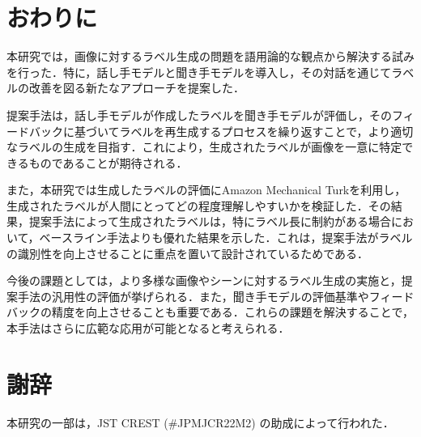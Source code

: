 \documentclass[a4paper,11pt]{jreport}
\begin{document}
\chapter{おわりに}

本研究では，画像に対するラベル生成の問題を語用論的な観点から解決する試みを行った．特に，話し手モデルと聞き手モデルを導入し，その対話を通じてラベルの改善を図る新たなアプローチを提案した．

提案手法は，話し手モデルが作成したラベルを聞き手モデルが評価し，そのフィードバックに基づいてラベルを再生成するプロセスを繰り返すことで，より適切なラベルの生成を目指す．これにより，生成されたラベルが画像を一意に特定できるものであることが期待される．

また，本研究では生成したラベルの評価にAmazon Mechanical Turkを利用し，生成されたラベルが人間にとってどの程度理解しやすいかを検証した．その結果，提案手法によって生成されたラベルは，特にラベル長に制約がある場合において，ベースライン手法よりも優れた結果を示した．これは，提案手法がラベルの識別性を向上させることに重点を置いて設計されているためである．

今後の課題としては，より多様な画像やシーンに対するラベル生成の実施と，提案手法の汎用性の評価が挙げられる．また，聞き手モデルの評価基準やフィードバックの精度を向上させることも重要である．これらの課題を解決することで，本手法はさらに広範な応用が可能となると考えられる．

\chapter*{謝辞}

本研究の一部は，JST CREST (\#JPMJCR22M2) の助成によって行われた．

\newpage

\renewcommand{\bibname}{参考文献}



\end{document}
